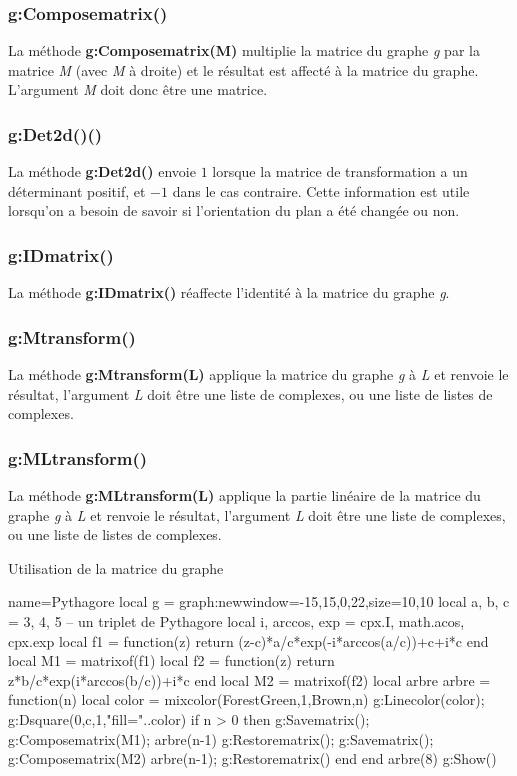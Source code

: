 \subsubsection{g:Composematrix()}
La méthode \textbf{g:Composematrix(M)} multiplie la matrice du graphe \emph g par la matrice \emph{M} (avec \emph{M} à droite) et le résultat est affecté à la matrice du graphe. L'argument \emph{M} doit donc être une matrice.

\subsubsection{g:Det2d()()}
La méthode \textbf{g:Det2d()} envoie $1$ lorsque la matrice de transformation a un déterminant positif, et $-1$ dans le cas contraire. Cette information est utile lorsqu'on a besoin de savoir si l'orientation du plan a été changée ou non.

\subsubsection{g:IDmatrix()}
La méthode \textbf{g:IDmatrix()} réaffecte l'identité à la matrice du graphe \emph g.

\subsubsection{g:Mtransform()}
La méthode \textbf{g:Mtransform(L)} applique la matrice du graphe \emph g à \emph{L} et renvoie le résultat, l'argument \emph L doit être une liste de complexes, ou une liste de listes de complexes.

\subsubsection{g:MLtransform()}
La méthode \textbf{g:MLtransform(L)} applique la partie linéaire de la matrice du graphe \emph g à \emph{L} et renvoie le résultat, l'argument \emph L doit être une liste de complexes, ou une liste de listes de complexes.

\begin{demo}{Utilisation de la matrice du graphe}
\begin{luadraw}{name=Pythagore}
local g = graph:new{window={-15,15,0,22},size={10,10}}
local a, b, c = 3, 4, 5 -- un triplet de Pythagore
local i, arccos, exp = cpx.I, math.acos, cpx.exp
local f1 = function(z)
        return (z-c)*a/c*exp(-i*arccos(a/c))+c+i*c end
local M1 = matrixof(f1)
local f2 = function(z)
        return z*b/c*exp(i*arccos(b/c))+i*c end
local M2 = matrixof(f2)
local arbre
arbre = function(n)
    local color = mixcolor(ForestGreen,1,Brown,n)
    g:Linecolor(color); g:Dsquare(0,c,1,"fill="..color)
    if n > 0 then
        g:Savematrix(); g:Composematrix(M1); arbre(n-1)
        g:Restorematrix(); g:Savematrix(); g:Composematrix(M2)
        arbre(n-1); g:Restorematrix()
    end
end
arbre(8)
g:Show()
\end{luadraw}
\end{demo}


